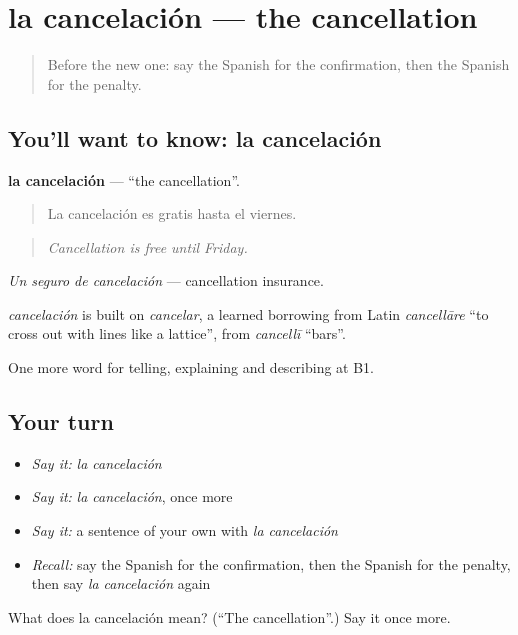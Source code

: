 \section[la cancelación]{la cancelación — the cancellation}

\label{lesson:ES-C662-cancelacion}



\begin{quote}
Before the new one: say the Spanish for the confirmation, then the Spanish for the penalty.
\end{quote}

\subsection*{You'll want to know: la cancelación}
\textbf{la cancelación} — \textquotedblleft{}the cancellation\textquotedblright{}.

\begin{quote}
La cancelación es gratis hasta el viernes.
\end{quote}

\begin{quote}
\emph{Cancellation is free until Friday.}
\end{quote}

\emph{Un seguro de cancelación} — cancellation insurance.

\begin{cousinweb}
\emph{cancelación} is built on \emph{cancelar}, a learned borrowing from Latin \emph{cancellāre} \textquotedblleft{}to cross out with lines like a lattice\textquotedblright{}, from \emph{cancellī} \textquotedblleft{}bars\textquotedblright{}.
\end{cousinweb}

\begin{grammarlens}[title={What you've built}]
One more word for telling, explaining and describing at B1.
\end{grammarlens}

\subsection*{Your turn}
\begin{itemize}
\raggedright
  \item \emph{Say it:} \emph{la cancelación}
  \item \emph{Say it:} \emph{la cancelación}, once more
  \item \emph{Say it:} a sentence of your own with \emph{la cancelación}
  \item \emph{Recall:} say the Spanish for the confirmation, then the Spanish for the penalty, then say \emph{la cancelación} again
\end{itemize}

\begin{tcolorbox}[breakable,colback=teal!4,colframe=teal!35!black,title={Before you move on}]
What does la cancelación mean? (\textquotedblleft{}The cancellation\textquotedblright{}.) Say it once more.
\end{tcolorbox}
